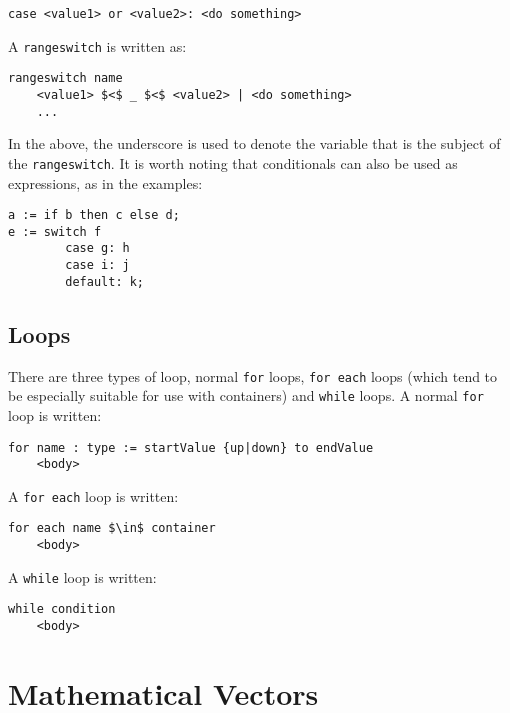 \begin{lstlisting}[style=Snippet]
case <value1> or <value2>: <do something>
\end{lstlisting}
%
A \lstinline[language=Pseudocode]$rangeswitch$ is written as:
%
\begin{lstlisting}[style=Snippet]
rangeswitch name
	<value1> $<$ _ $<$ <value2> | <do something>
	...
\end{lstlisting}
%
In the above, the underscore is used to denote the variable that is the subject of the \lstinline[language=Pseudocode]$rangeswitch$. It is worth noting that conditionals can also be used as expressions, as in the examples:
%
\begin{lstlisting}[style=Snippet]
a := if b then c else d;
e := switch f
		case g: h
		case i: j
		default: k;
\end{lstlisting}

\subsection{Loops}

There are three types of loop, normal \lstinline[language=Pseudocode]$for$ loops, \lstinline[language=Pseudocode]$for each$ loops (which tend to be especially suitable for use with containers) and \lstinline[language=Pseudocode]$while$ loops. A normal \lstinline[language=Pseudocode]$for$ loop is written:
%
\begin{lstlisting}[style=Snippet]
for name : type := startValue {up|down} to endValue
	<body>
\end{lstlisting}

\newpage

\noindent A \lstinline[language=Pseudocode]$for each$ loop is written:
%
\begin{lstlisting}[style=Snippet]
for each name $\in$ container
	<body>
\end{lstlisting}
%
A \lstinline[language=Pseudocode]$while$ loop is written:
%
\begin{lstlisting}[style=Snippet]
while condition
	<body>
\end{lstlisting}

\section{Mathematical Vectors}


